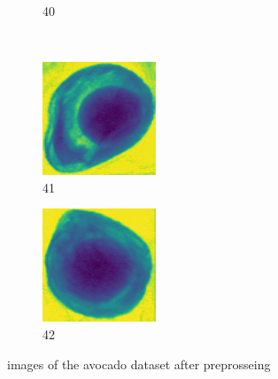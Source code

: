 \documentclass[11pt]{article}
\begin{document}
\begin{figure}[!h]
\begin{subfigure}[b]{0.22\textwidth}
         \caption{40}
         \label{fig:avo_39}
     \end{subfigure}
                         \\
    \begin{subfigure}[b]{0.22\textwidth}
         \centering
         \includegraphics[width=\textwidth]{figurer/avocado_dataset/avo_40.jpg}
         \caption{41}
         \label{fig:avo_40}
     \end{subfigure}
     \hfill
     \begin{subfigure}[b]{0.22\textwidth}
         \centering
         \includegraphics[width=\textwidth]{figurer/avocado_dataset/avo_41.jpg}
         \caption{42}
         \label{fig:avo_41}
     \end{subfigure}
    \caption{images of the avocado dataset after preprosseing}
\end{figure}
\end{document}
